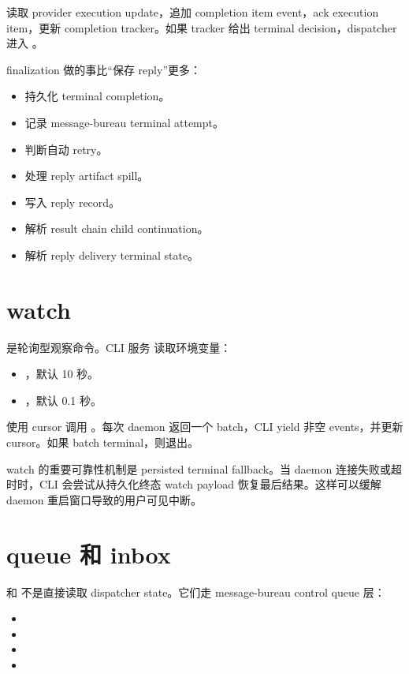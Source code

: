  读取 provider execution update，追加 completion item event，ack execution item，更新 completion tracker。如果 tracker 给出 terminal decision，dispatcher 进入 。

finalization 做的事比“保存 reply”更多：

\begin{itemize}
  \item 持久化 terminal completion。
  \item 记录 message-bureau terminal attempt。
  \item 判断自动 retry。
  \item 处理 reply artifact spill。
  \item 写入 reply record。
  \item 解析 result chain child continuation。
  \item 解析 reply delivery terminal state。
\end{itemize}

\section{watch}

 是轮询型观察命令。CLI 服务  读取环境变量：

\begin{itemize}
  \item {}，默认 10 秒。
  \item {}，默认 0.1 秒。
\end{itemize}

 使用 cursor 调用 。每次 daemon 返回一个 batch，CLI yield 非空 events，并更新 cursor。如果 batch terminal，则退出。

watch 的重要可靠性机制是 persisted terminal fallback。当 daemon 连接失败或超时时，CLI 会尝试从持久化终态 watch payload 恢复最后结果。这样可以缓解 daemon 重启窗口导致的用户可见中断。

\section{queue 和 inbox}

 和  不是直接读取 dispatcher state。它们走 message-bureau control queue 层：

\begin{itemize}
  \item {}
  \item {}
  \item {}
  \item {}
\end{itemize}

